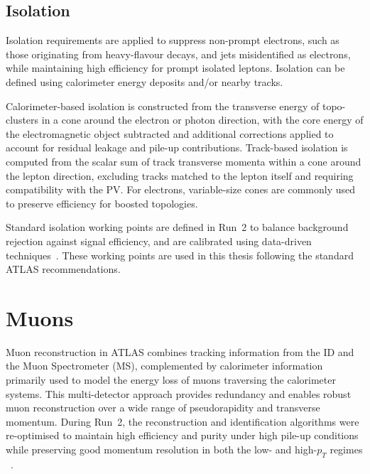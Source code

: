 
\subsection{Isolation}

Isolation requirements are applied to suppress non-prompt electrons, such as those
originating from heavy-flavour decays, and jets misidentified as electrons, while
maintaining high efficiency for prompt isolated leptons.
Isolation can be defined using calorimeter energy deposits and/or nearby tracks.

Calorimeter-based isolation is constructed from the transverse energy of
topo-clusters in a cone around the electron or photon direction, with the core
energy of the electromagnetic object subtracted and additional corrections
applied to account for residual leakage and pile-up contributions.
Track-based isolation is computed from the scalar sum of track transverse momenta
within a cone around the lepton direction, excluding tracks matched to the lepton
itself and requiring compatibility with the PV.
For electrons, variable-size cones are commonly used to preserve efficiency for
boosted topologies.

Standard isolation working points are defined in Run~2 to balance background
rejection against signal efficiency, and are calibrated using data-driven
techniques~\cite{ATLASeGammaPerformance2019}.
These working points are used in this thesis following the standard ATLAS
recommendations.

\section{Muons}
\label{sec:reco-muons}

Muon reconstruction in ATLAS combines tracking information from the ID and the
Muon Spectrometer (MS), complemented by calorimeter information primarily used
to model the energy loss of muons traversing the calorimeter systems.
This multi-detector approach provides redundancy and enables robust muon
reconstruction over a wide range of pseudorapidity and transverse momentum.
During Run~2, the reconstruction and identification algorithms were re-optimised
to maintain high efficiency and purity under high pile-up conditions while
preserving good momentum resolution in both the low- and high-$p_T$ regimes%
~\cite{ATLASMuonReco2021,ATLASMuonReco2016}.

